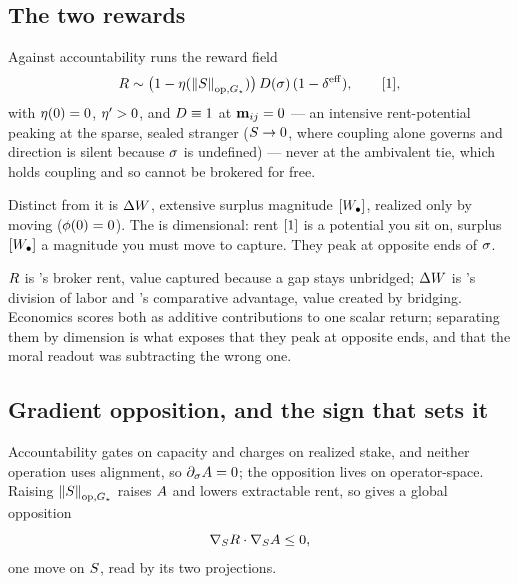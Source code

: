 \documentclass[../main]{subfiles}
\begin{document}
\subsection{The two rewards}
\label{subsec:ont:rewards}
%
%
\begin{definition}
  Against accountability runs the reward field
  \begin{equation}
    \rewardfield \sim \bigl(1-\attenuation(\opnormG{\comovfield})\bigr)\,\rewardpotential(\leanbare)\,(1-\effdensity),
    \qquad \dimratio,
    \label{eq:f:rew}
  \end{equation}
  with $\eta(0)=0$, $\eta'>0$, and $D\equiv1$ at $\mathbf{m}\sb{ ij }=0$ --- an intensive rent-potential
  peaking at the sparse, sealed stranger ($S\to0$, where coupling
  alone governs and direction is silent because $\sigma$ is undefined) --- never at the
  ambivalent tie, which holds coupling and so cannot be brokered for free.
\end{definition}

Distinct from it is $\Delta W$, extensive surplus magnitude $[W\sb{\bullet}]$, realized only by
moving ($\phi(0)=0$). The  is dimensional: rent $[1]$ is a potential you
sit on, surplus $[W\sb{\bullet}]$ a magnitude you must move to capture. They peak at opposite ends
of $\sigma$.

\begin{econ}[label=e:rent-surplus, title={Broker rent versus the gains from trade},
  ref=f:rew, cites={a:burt,a:smithdiv,a:ricardo}, departs=flatten,
  stopsat={scores both as additive returns to one scalar; misses that they peak at opposite ends}]
  $R$ is \textcite{a:burt}'s broker rent, value captured because a gap stays
  unbridged; $\Delta W$ is \textcite{a:smithdiv}'s division of labor and
  \textcite{a:ricardo}'s comparative advantage, value created by bridging. Economics scores
  both as additive contributions to one scalar return; separating them by dimension is what
  exposes that they peak at opposite ends, and that the moral readout  was
  subtracting the wrong one.
\end{econ}

\subsection{Gradient opposition, and the sign that sets it}
\label{subsec:ont:opposition}
%
\begin{proposition}
  Accountability gates on capacity and charges on realized stake, and neither operation uses
  alignment, so $\partial_{\sigma}A=0$; the opposition lives
  on operator-space. Raising $\left\lVert S \right\rVert\sb{\mathrm{op}, \ensuremath{G\sb{\star}} }$ raises $A$ and lowers extractable rent, so
   gives a global opposition
  \begin{equation}
    \nabla_{S}R\cdot\nabla_{S}A\le0,
    \label{eq:f:opp}
  \end{equation}
  one move on $S$, read by its two projections.
\end{proposition}
\end{document}
